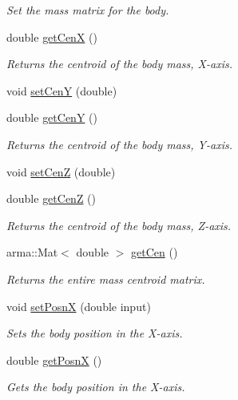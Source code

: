 \begin{DoxyCompactItemize}
\begin{DoxyCompactList}\small\item\em Set the mass matrix for the body. \end{DoxyCompactList}\item 
double \hyperlink{classosea_1_1ofreq_1_1_body_a7723a89d7d4b893a82dd693571a9449a}{get\-Cen\-X} ()
\begin{DoxyCompactList}\small\item\em Returns the centroid of the body mass, X-\/axis. \end{DoxyCompactList}\item 
void \hyperlink{classosea_1_1ofreq_1_1_body_abebc4472a354ea0d6307ccaff75714db}{set\-Cen\-Y} (double)
\item 
double \hyperlink{classosea_1_1ofreq_1_1_body_a5bafecfaa43dd1cf5deef6ada9d03858}{get\-Cen\-Y} ()
\begin{DoxyCompactList}\small\item\em Returns the centroid of the body mass, Y-\/axis. \end{DoxyCompactList}\item 
void \hyperlink{classosea_1_1ofreq_1_1_body_a866a9f5959854435e8efb688a3d09af7}{set\-Cen\-Z} (double)
\item 
double \hyperlink{classosea_1_1ofreq_1_1_body_aeab53e414035366be2094485ef72c3b7}{get\-Cen\-Z} ()
\begin{DoxyCompactList}\small\item\em Returns the centroid of the body mass, Z-\/axis. \end{DoxyCompactList}\item 
arma\-::\-Mat$<$ double $>$ \hyperlink{classosea_1_1ofreq_1_1_body_a4e48c171b46972f1348fdf140876210e}{get\-Cen} ()
\begin{DoxyCompactList}\small\item\em Returns the entire mass centroid matrix. \end{DoxyCompactList}\item 
void \hyperlink{classosea_1_1ofreq_1_1_body_af507be7e52f44404e7664dd623585780}{set\-Posn\-X} (double input)
\begin{DoxyCompactList}\small\item\em Sets the body position in the X-\/axis. \end{DoxyCompactList}\item 
double \hyperlink{classosea_1_1ofreq_1_1_body_ad649f4405ae4b8e91f69e5e54ff68dcd}{get\-Posn\-X} ()
\begin{DoxyCompactList}\small\item\em Gets the body position in the X-\/axis. \end{DoxyCompactList}\item 

\end{DoxyCompactItemize}

